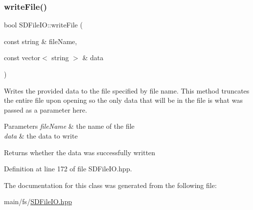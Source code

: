 \subsubsection{\texorpdfstring{writeFile()}{writeFile()}}
{\footnotesize\ttfamily bool S\+D\+File\+I\+O\+::write\+File (\begin{DoxyParamCaption}\item[{const string \&}]{file\+Name,  }\item[{const vector$<$ string $>$ \&}]{data }\end{DoxyParamCaption})\hspace{0.3cm}{\ttfamily [inline]}}

Writes the provided data to the file specified by file name. This method truncates the entire file upon opening so the only data that will be in the file is what was passed as a parameter here.


\begin{DoxyParams}{Parameters}
{\em file\+Name} & the name of the file \\
\hline
{\em data} & the data to write \\
\hline
\end{DoxyParams}
\begin{DoxyReturn}{Returns}
whether the data was successfully written 
\end{DoxyReturn}


Definition at line 172 of file S\+D\+File\+I\+O.\+hpp.


\begin{DoxyCode}{0}

\end{DoxyCode}


The documentation for this class was generated from the following file\+:\begin{DoxyCompactItemize}
\item 
main/fs/\mbox{\hyperlink{SDFileIO_8hpp}{S\+D\+File\+I\+O.\+hpp}}\end{DoxyCompactItemize}
